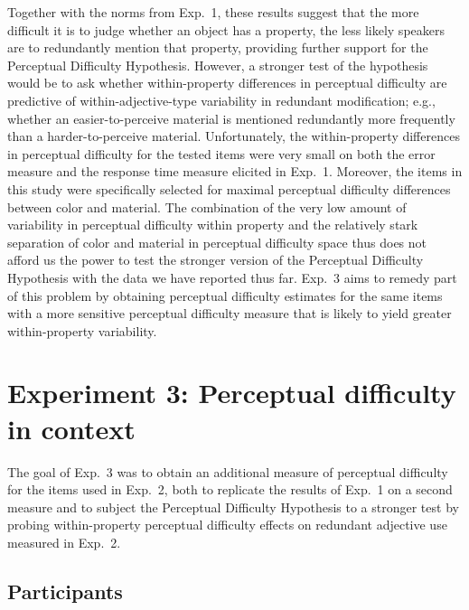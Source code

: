 \documentclass[12pt,letterpaper]{article}
\begin{document}

Together with the norms from Exp.~1, these results suggest that the more difficult it is to judge whether an object has a property, the less likely speakers are to redundantly mention that property, providing further  support for the Perceptual Difficulty Hypothesis. However, a stronger test of the hypothesis would be to ask whether within-property differences in perceptual difficulty are predictive of within-adjective-type variability in redundant modification; e.g., whether an easier-to-perceive material is mentioned redundantly more frequently than a harder-to-perceive material. Unfortunately, the within-property differences in perceptual difficulty for the tested items were very small on both the error measure and the response time measure elicited in Exp.~1. Moreover, the items in this study were specifically selected for maximal perceptual difficulty differences between color and material. The combination of the very low amount of variability in perceptual difficulty within property and the relatively stark separation of color and material in perceptual difficulty space thus does not afford us the power to test the stronger version of the Perceptual Difficulty Hypothesis with the data we have reported thus far. Exp.~3 aims to remedy part of this problem by obtaining perceptual difficulty estimates for the same items with a more sensitive perceptual difficulty measure that is likely to yield greater within-property variability.

\section{Experiment 3: Perceptual difficulty in context} 

The goal of Exp.~3 was to obtain an additional measure of perceptual difficulty for the items used in Exp.~2, both to replicate the results of Exp.~1 on a second measure and to subject the Perceptual Difficulty Hypothesis to a stronger test by probing within-property perceptual difficulty effects on redundant adjective use measured in Exp.~2.

\subsection{Participants} 
\end{document}

